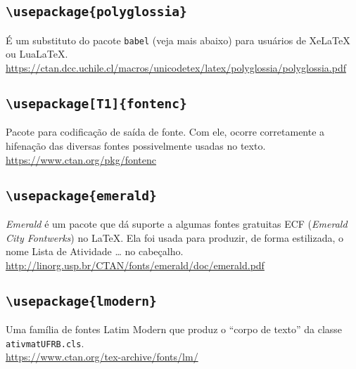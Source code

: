 \subsection*{\texttt{\textbackslash usepackage\{polyglossia\}}}
É um substituto do pacote \texttt{babel} (veja mais abaixo) para usuários de 
XeLaTeX ou LuaLaTeX.\\
{\small \url{https://ctan.dcc.uchile.cl/macros/unicodetex/latex/polyglossia/polyglossia.pdf}}

\subsection*{\texttt{\textbackslash usepackage[T1]\{fontenc\}}}
Pacote para codificação de saída de fonte.
Com ele, ocorre corretamente a hifenação das diversas fontes possivelmente 
usadas no texto.\\
{\small\url{https://www.ctan.org/pkg/fontenc}}

\subsection*{\texttt{\textbackslash usepackage\{emerald\}}}
\emph{Emerald} é um pacote que dá suporte a algumas fontes gratuitas ECF 
(\emph{Emerald City Fontwerks}) no \LaTeX.
Ela foi usada para produzir, de forma estilizada, o nome 
{\ECFIntimacy Lista de Atividade \ldots} no cabeçalho.\\
{\small\url{http://linorg.usp.br/CTAN/fonts/emerald/doc/emerald.pdf}}

\subsection*{\texttt{\textbackslash usepackage\{lmodern\}}}
Uma família de fontes Latim Modern que produz o ``corpo de texto'' da classe 
\texttt{ativmatUFRB.cls}.\\
{\small\url{https://www.ctan.org/tex-archive/fonts/lm/}}

